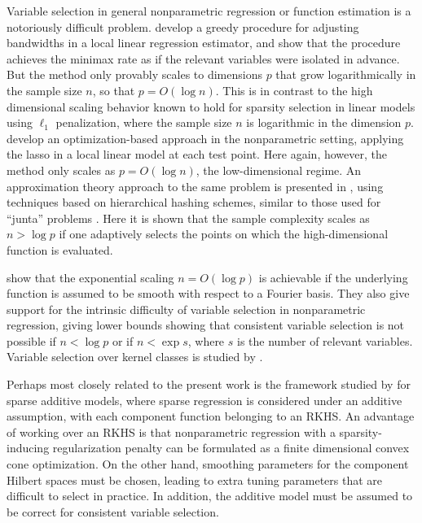 Variable selection in general nonparametric regression or function
estimation is a notoriously difficult problem. \citet{lafferty2008rodeo} develop a greedy procedure for
adjusting bandwidths in a local linear regression estimator,
and show that the procedure achieves the minimax rate
as if the relevant variables were isolated in advance.
But the method only provably scales to dimensions $p$ that 
grow logarithmically in the sample size $n$, so that $p = O(\log n)$.  This
is in contrast to the high dimensional scaling behavior
known to hold for sparsity selection in linear models
using $\ell_1$ penalization, where the sample size $n$
is logarithmic in the dimension $p$. \citet{bertin:08}
develop an optimization-based approach in
the nonparametric setting, applying the lasso
in a local linear model at each test point.  Here again,
however, the method only scales as $p = O(\log n)$,
the low-dimensional regime.
An approximation theory approach to the same
problem is presented in \cite{devore:11}, 
using techniques based on hierarchical hashing schemes,
similar to those used for ``junta'' problems \citep{mossel:04}.
Here it is shown that the sample complexity scales as $n > \log p$ 
if one adaptively selects the points on
which the high-dimensional function is evaluated.

\citet{dalalyan:12} show that the exponential scaling $n=O(\log p)$ is
achievable if the underlying function is assumed to be smooth with
respect to a Fourier basis. They also give support for the intrinsic
difficulty of variable selection in nonparametric regression, giving
lower bounds showing that consistent variable selection is not
possible if $n < \log p$ or if $n < \exp s$, where $s$ is the number
of relevant variables.  Variable selection over kernel classes is
studied by \citet{Kolch:10}.

Perhaps most closely related to the present work is the framework
studied by \cite{Raskutti:12} for sparse additive models, where sparse
regression is considered under an additive assumption, with each
component function belonging to an RKHS.  An advantage of working over
an RKHS is that nonparametric regression with a sparsity-inducing
regularization penalty can be formulated as a finite dimensional
convex cone optimization.  On the other hand, smoothing parameters for
the component Hilbert spaces must be chosen, leading to extra tuning
parameters that are difficult to select in practice.  In addition, the
additive model must be assumed to be correct for consistent variable
selection.

